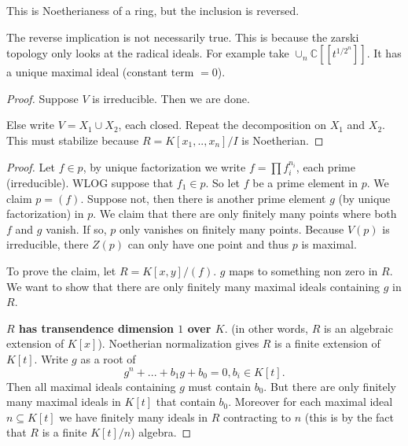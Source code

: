 \begin{remark}
    This is Noetherianess of a ring, but the inclusion is reversed.
\end{remark}
\begin{remark}
    The reverse implication is not necessarily true. This is because the zarski topology only looks at the radical ideals. For example take $\cup_n\mathbb{C}[[t^{1/2^n}]]$. It has a unique maximal ideal (constant term $=0$).
\end{remark}
\begin{proof}
    Suppose $V$ is irreducible. Then we are done. 

    Else write $V=X_1\cup X_2$, each closed. Repeat the decomposition on $X_1$ and $X_2$. This must stabilize because $R=K[x_1,..,x_n]/I$ is Noetherian.
\end{proof}
\begin{proof}
    Let $f\in p$, by unique factorization we write $f=\prod f_i^{n_i}$, each prime (irreducible). WLOG suppose that $f_1\in p$. So let $f$ be a prime element in $p$. We claim $p=(f)$. Suppose not, then there is another prime element $g$ (by unique factorization) in $p$. We claim that there are only finitely many points where both $f$ and $g$ vanish. If so, $p$ only vanishes on finitely many points. Because $V(p)$ is irreducible, there $Z(p)$ can only have one point and thus $p$ is maximal.
    
    
    To prove the claim, let $R=K[x,y]/(f)$. $g$ maps to something non zero in $R$. We want to show that there are only finitely many maximal ideals containing $g$ in $R$. 

    \textbf{$R$ has transendence dimension $1$ over $K$}. (in other words, $R$ is an algebraic extension of $K[x]$). Noetherian normalization gives $R$ is a finite extension of $K[t]$. Write $g$ as a root of  \[
    g^n + ...+b_1g+b_0=0, b_i\in K[t].
    \]
    Then all maximal ideals containing $g$ must contain $b_0$. But there are only finitely many maximal ideals in $K[t]$ that contain $b_0$. Moreover for each maximal ideal $n\subseteq K[t]$ we have finitely many ideals in $R$ contracting to $n$ (this is by the fact that $R$ is a finite $K[t]/n$) algebra.
\end{proof}
